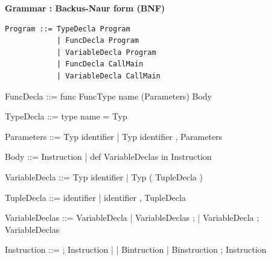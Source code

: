 \documentclass[11pt]{report}
\begin{document}
\newpage
\centerline{\textbf{\Huge Grammar : Backus-Naur form (BNF)}}
\vspace*{20 pt}
\vspace*{3pt}
\begin{Verbatim}[fontfamily=textsf]
Program ::= TypeDecla Program
            | FuncDecla Program
            | VariableDecla Program
            | FuncDecla CallMain
            | VariableDecla CallMain
\end{Verbatim}
\vspace*{3pt}

\begin{verbnobox}[\normalfont]
FuncDecla ::= func FuncType name (Parameters) Body
\end{verbnobox}
\vspace*{3pt}

\begin{verbnobox}[\normalfont]
TypeDecla ::= type name = Typ
\end{verbnobox}
\vspace*{3pt}

\begin{verbnobox}[\normalfont]
Parameters ::= Typ identifier | Typ identifier , Parameters
\end{verbnobox}
\vspace*{3pt}

\begin{verbnobox}[\normalfont]
Body ::= { Instruction } | { def VariableDeclas in Instruction }
\end{verbnobox}
\vspace*{3pt}

\begin{verbnobox}[\normalfont]
VariableDecla ::= Typ identifier | Typ ( TupleDecla )
\end{verbnobox}
\vspace*{3pt}

\begin{verbnobox}[\normalfont]
TupleDecla ::= identifier | identifier , TupleDecla
\end{verbnobox}
\vspace*{3pt}

\begin{verbnobox}[\normalfont]
VariableDeclas ::= VariableDecla 
                    | VariableDeclas ; 
                    | VariableDecla ; VariableDeclas
\end{verbnobox}
\vspace*{3pt}

\begin{verbnobox}[\normalfont]
Instruction ::= ; Instruction
               |
               | Bintruction 
               | Binstruction ; Instruction
\end{verbnobox}
\vspace*{3pt}
\end{document}
